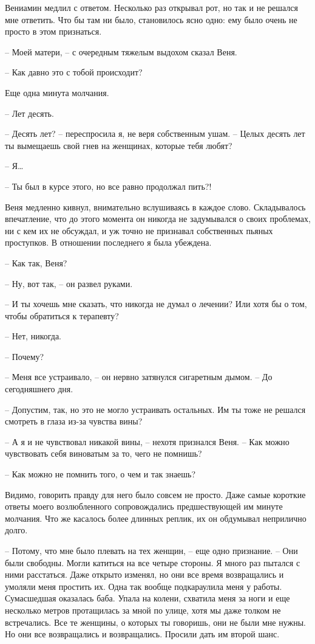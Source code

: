 \documentclass[
]{book}
\begin{document}
Вениамин медлил с ответом. Несколько раз открывал рот, но так и не решался мне ответить. Что бы там ни было, становилось ясно одно: ему было очень не просто в этом признаться.

-- Моей матери, -- с очередным тяжелым выдохом сказал Веня.

-- Как давно это с тобой происходит?

Еще одна минута молчания.

-- Лет десять.

-- Десять лет? -- переспросила я, не веря собственным ушам. -- Целых десять лет ты вымещаешь свой гнев на женщинах, которые тебя любят?

-- Я\ldots{}

-- Ты был в курсе этого, но все равно продолжал пить?!

Веня медленно кивнул, внимательно вслушиваясь в каждое слово. Складывалось впечатление, что до этого момента он никогда не задумывался о своих проблемах, ни с кем их не обсуждал, и уж точно не признавал собственных пьяных проступков. В отношении последнего я была убеждена.

-- Как так, Веня?

-- Ну, вот так, -- он развел руками.

-- И ты хочешь мне сказать, что никогда не думал о лечении? Или хотя бы о том, чтобы обратиться к терапевту?

-- Нет, никогда.

-- Почему?

-- Меня все устраивало, -- он нервно затянулся сигаретным дымом. -- До сегодняшнего дня.

-- Допустим, так, но это не могло устраивать остальных. Им ты тоже не решался смотреть в глаза из-за чувства вины?

-- А я и не чувствовал никакой вины, -- нехотя признался Веня. -- Как можно чувствовать себя виноватым за то, чего не помнишь?

-- Как можно не помнить того, о чем и так знаешь?

Видимо, говорить правду для него было совсем не просто. Даже самые короткие ответы моего возлюбленного сопровождались предшествующей им минуте молчания. Что же касалось более длинных реплик, их он обдумывал неприлично долго.

-- Потому, что мне было плевать на тех женщин, -- еще одно признание. -- Они были свободны. Могли катиться на все четыре стороны. Я много раз пытался с ними расстаться. Даже открыто изменял, но они все время возвращались и умоляли меня простить их. Одна так вообще подкараулила меня у работы. Сумасшедшая оказалась баба. Упала на колени, схватила меня за ноги и еще несколько метров протащилась за мной по улице, хотя мы даже толком не встречались. Все те женщины, о которых ты говоришь, они не были мне нужны. Но они все возвращались и возвращались. Просили дать им второй шанс.
\end{document}
